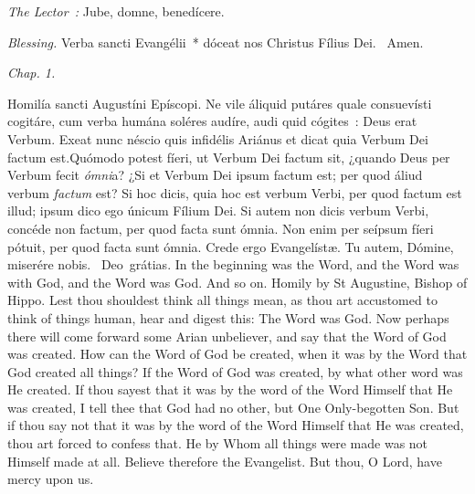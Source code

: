 {{  }

  {
    \bigskip
    {
    }
    \medskip

    \emph{The Lector~:} Jube, domne, benedícere.

    \emph{Blessing.} Verba sancti Evangélii~* dóceat nos Christus Fílius Dei. \Rbar{}~Amen.
  }

  \bigskip{}
  {


  }

  {
    \hspace{10ex}{Lesson IX.}\hfill\emph{Chap. 1.}\hspace{10ex}

    \begin{parcolumns}[rulebetween,colwidths={1=.45\linewidth}]{2}
    {Homilía sancti Augustíni Epíscopi.}%
    {Ne vile áliquid putáres quale consuevísti cogitáre, cum verba humána soléres audíre, audi quid cógites~: Deus erat Verbum. Exeat nunc néscio quis infidélis Ariánus et dicat quia Verbum Dei factum est.}{Quómodo potest fíeri, ut Verbum Dei factum sit, ¿quando Deus per Verbum fecit \emph{ómni}a? ¿Si et Verbum Dei ipsum factum est; per quod áliud verbum \emph{factum} est? Si hoc dicis, quia hoc est verbum Verbi, per quod factum est illud; ipsum dico ego únicum Fílium Dei. Si autem non dicis verbum Verbi, concéde non factum, per quod facta sunt ómnia. Non enim per seípsum fíeri pótuit, per quod facta sunt ómnia. Crede ergo Evangelístæ.
      Tu autem, Dómine, miserére nobis.
      \Rbar{}~Deo~grátias.}%
    {In the beginning was the Word, and the Word was with God, and the Word was God. And so on.}%
    {Homily by St Augustine, Bishop of Hippo.}%
    {Lest thou shouldest think all things mean, as thou art accustomed to think of things human, hear and digest this: The Word was God. Now perhaps there will come forward some Arian unbeliever, and say that the Word of God was created. How can the Word of God be created, when it was by the Word that God created all things? If the Word of God was created, by what other word was He created. If thou sayest that it was by the word of the Word Himself that He was created, I tell thee that God had no other, but One Only-begotten Son. But if thou say not that it was by the word of the Word Himself that He was created, thou art forced to confess that. He by Whom all things were made was not Himself made at all. Believe therefore the Evangelist.
      But thou, O Lord, have mercy upon us.}
    \end{parcolumns}

}}
